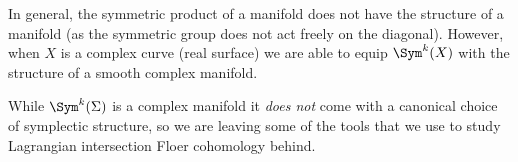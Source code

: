 

In general, the symmetric product of a manifold does not have the structure of a manifold (as the symmetric group does not act freely on the diagonal). However, when $X$ is a complex curve (real surface) we are able to equip $\Sym^k(X)$ with the structure of a smooth complex manifold.



While $\Sym^k(\Sigma)$ is a complex manifold it \emph{does not} come with a canonical choice of symplectic structure, so we are leaving some of the tools that we use to study Lagrangian intersection Floer cohomology behind. 